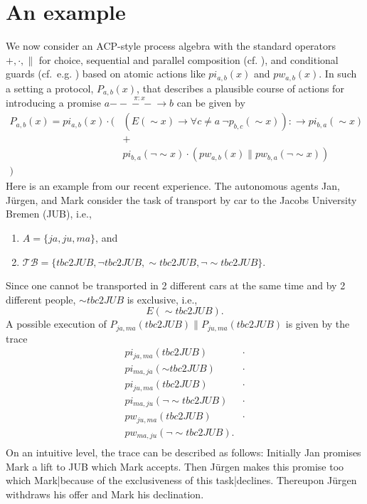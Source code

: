 \documentclass{pseudoelsart}
\newcommand{\prom}[3]{#1 \overset{\pi:#2}{- \!\!\!- \!\!\!- \!\!\!- \!\!\!\!\!\!\!\!\longrightarrow} #3}
\newcommand{\geb}{{\sim}}
\begin{document}
\section{An example}

We now consider an ACP-style process algebra with the standard
operators $+, \cdot, \parallel$ for choice, sequential and parallel composition (cf. \cite{BW90,F00}), and conditional guards (cf.\ e.g. \cite{BB92}) 
based on
atomic actions like $pi_{a,b}(x)$ and $pw_{a,b}(x)$. In such a setting a protocol, $P_{a,b}(x)$, that describes
a plausible course of actions for introducing a promise $\prom{a}{x}{b}$ can be given by
\[
\begin{array}{rl}
P_{a,b}(x) = pi_{a,b}(x) \cdot ( & (E(\geb x)\rightarrow \forall c\neq a\ \neg p_{b,c}(\geb x)):
\rightarrow pi_{b,a}(\geb x)\\
& + \\
&pi_{b,a}(\neg \geb x) \cdot (pw_{a,b}(x) \parallel pw_{b,a}(\neg \geb x))\\
)&
\end{array}
\]
Here is an example from our recent experience. The  autonomous agents 
Jan, J\"urgen, and Mark consider the task of transport by car to the Jacobs
University Bremen (JUB), i.e.,
\begin{enumerate}
\item $A=\{ja, ju, ma\}$, and
\item $\mathcal{TB}=\{\mathit{tbc2JUB}, \neg \mathit{tbc2JUB}, \geb \mathit{tbc2JUB}, \neg \geb \mathit{tbc2JUB}\}$.
\end{enumerate}
Since one cannot be transported in 2 different cars at the same time and by 2 
different people, $\geb \mathit{tbc2JUB}$ is exclusive, i.e.,
\[
E(\geb \mathit{tbc2JUB}). 
\]
A possible execution of $P_{ja,ma}(\mathit{tbc2JUB})\parallel P_{ju,ma}(
\mathit{tbc2JUB})$ is given by the trace
\[
\begin{array}{ll}
pi_{ja,ma}(\mathit{tbc2JUB})&\cdot\\
pi_{ma,ja}(\mathit{\geb tbc2JUB})&\cdot\\
pi_{ju,ma}(\mathit{tbc2JUB})&\cdot\\
pi_{ma,ju}(\mathit{\neg \geb tbc2JUB})&\cdot\\
pw_{ju,ma}(\mathit{tbc2JUB})&\cdot\\
pw_{ma,ju}(\mathit{\neg \geb tbc2JUB}).&\\
\end{array}
\]
On an intuitive level, the trace can be described as follows:
Initially Jan promises Mark a lift to JUB which Mark accepts. Then 
J\"urgen makes this promise too which Mark|because of the exclusiveness of this
task|declines. Thereupon J\"urgen withdraws his offer and Mark his declination.
\end{document}
